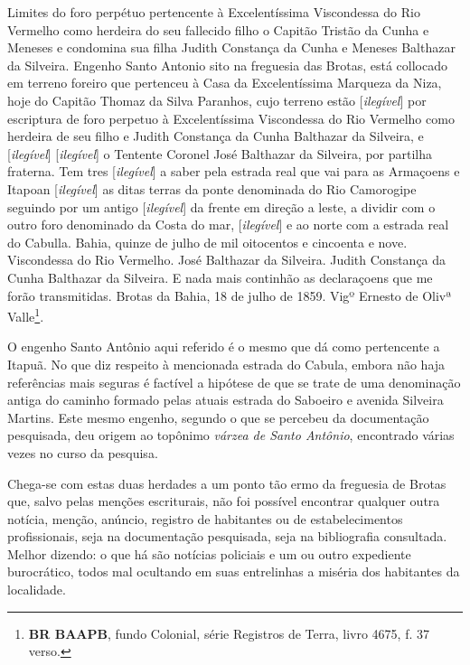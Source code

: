 \begin{citacao}
Limites do foro perpétuo pertencente à Excelentíssima Viscondessa do Rio Vermelho como herdeira do seu fallecido filho o Capitão Tristão da Cunha e Meneses e condomina sua filha Judith Constança da Cunha e Meneses Balthazar da Silveira. Engenho Santo Antonio sito na freguesia das Brotas, está collocado em terreno foreiro que pertenceu à Casa da Excelentíssima Marqueza da Niza, hoje do Capitão Thomaz da Silva Paranhos, cujo terreno estão [\textit{ilegível}] por escriptura de foro perpetuo à Excelentíssima Viscondessa do Rio Vermelho como herdeira de seu filho e Judith Constança da Cunha Balthazar da Silveira, e [\textit{ilegível}] [\textit{ilegível}] o Tentente Coronel José Balthazar da Silveira, por partilha fraterna. Tem tres [\textit{ilegível}] a saber pela estrada real que vai para as Armaçoens e Itapoan [\textit{ilegível}] as ditas terras da ponte denominada do Rio Camorogipe seguindo por um antigo [\textit{ilegível}] da frente em direção a leste, a dividir com o outro foro denominado da Costa do mar, [\textit{ilegível}] e ao norte com a estrada real do Cabulla. Bahia, quinze de julho de mil oitocentos e cincoenta e nove. Viscondessa do Rio Vermelho. José Balthazar da Silveira. Judith Constança da Cunha Balthazar da Silveira. E nada mais continhão as declaraçoens que me forão transmitidas. Brotas da Bahia, 18 de julho de 1859. Vigº Ernesto de Olivª Valle\footnote{\textbf{BR BAAPB}, fundo Colonial, série Registros de Terra, livro 4675, f. 37 verso.}.
\end{citacao}

O engenho Santo Antônio aqui referido é o mesmo que  dá como pertencente a Itapuã. No que diz respeito à mencionada estrada do Cabula, embora não haja referências mais seguras é factível a hipótese de que se trate de uma denominação antiga do caminho formado pelas atuais estrada do Saboeiro e avenida Silveira Martins. Este mesmo engenho, segundo o que se percebeu da documentação pesquisada, deu origem ao topônimo \textit{várzea de Santo Antônio}, encontrado várias vezes no curso da pesquisa.

Chega-se com estas duas herdades a um ponto tão ermo da freguesia de Brotas que, salvo pelas menções escriturais, não foi possível encontrar qualquer outra notícia, menção, anúncio, registro de habitantes ou de estabelecimentos profissionais, seja na documentação pesquisada, seja na bibliografia consultada. Melhor dizendo: o que há são notícias policiais e um ou outro expediente burocrático, todos mal ocultando em suas entrelinhas a miséria dos habitantes da localidade.

